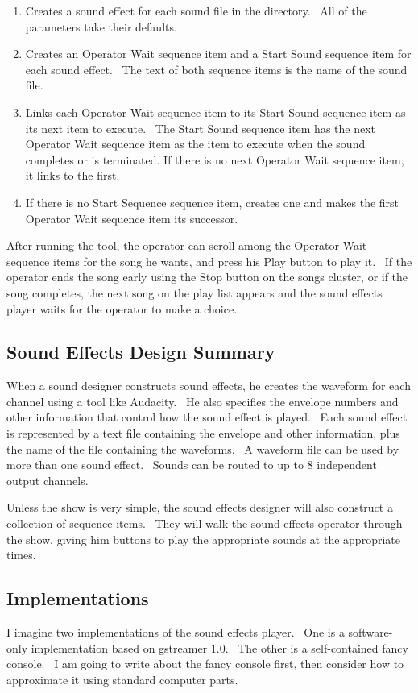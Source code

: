 \documentclass[letterpaper]{article}
\newcommand\liststyleLxxi{%
\renewcommand\theenumi{\arabic{enumi}}
\renewcommand\theenumii{\arabic{enumii}}
\renewcommand\theenumiii{\arabic{enumiii}}
\renewcommand\theenumiv{\arabic{enumiv}}
\renewcommand\labelenumi{\theenumi.}
\renewcommand\labelenumii{\theenumii.}
\renewcommand\labelenumiii{\theenumiii.}
\renewcommand\labelenumiv{\theenumiv.}
}
\begin{document}
\liststyleLxxi
\begin{enumerate}
\item Creates a sound effect for each sound file in the directory. \ All
of the parameters take their defaults.
\item Creates an Operator Wait sequence item and a Start Sound sequence
item for each sound effect. \ The text of both sequence items is the
name of the sound file.
\item Links each Operator Wait sequence item to its Start Sound sequence
item as its next item to execute. \ The Start Sound sequence item has
the next Operator Wait sequence item as the item to execute when the
sound completes or is terminated. If there is no next Operator Wait
sequence item, it links to the first.
\item If there is no Start Sequence sequence item, creates one and makes
the first Operator Wait sequence item its successor.
\end{enumerate}
After running the tool, the operator can scroll among the Operator Wait
sequence items for the song he wants, and press his Play button to play
it. \ If the operator ends the song early using the Stop button on the
song{\textquotesingle}s cluster, or if the song completes, the next
song on the play list appears and the sound effects player waits for
the operator to make a choice.

\subsection{Sound Effects Design Summary}
When a sound designer constructs sound effects, he creates the waveform
for each channel using a tool like Audacity. \ He also specifies the
envelope numbers and other information that control how the sound
effect is played. \ Each sound effect is represented by a text file
containing the envelope and other information, plus the name of the
file containing the waveforms. \ A waveform file can be used by more
than one sound effect. \ Sounds can be routed to up to 8 independent
output channels.

Unless the show is very simple, the sound effects designer will also
construct a collection of sequence items. \ They will walk the sound
effects operator through the show, giving him buttons to play the
appropriate sounds at the appropriate times.

\subsection{Implementations}
I imagine two implementations of the sound effects player. \ One is a
software-only implementation based on gstreamer 1.0. \ The other is a
self-contained fancy console. \ I am going to write about the fancy
console first, then consider how to approximate it using standard
computer parts.
\end{document}
